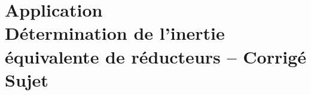 \chapter*{Application  \\ 
Détermination de l'inertie équivalente de réducteurs -- \ifprof Corrigé \else Sujet \fi}

\iflivret {} \else
\ifprof  {} \else \fi
\fi

\newcommand{\repappli}{\repRel/PSI_ExercicesCompetences/TEC/TEC-04-Meq-Jeq/}
\newcommand{\appli}{23_TrainSimple}

\renewcommand{\nomExo}{Cy_05_01_Application_00_Reducteurs}

\renewcommand{\appli}{23_TrainSimple}
\graphicspath{{\repStyle/png}{\repappli\appli/images}}


\renewcommand{\appli}{26_RoueMotrice}
\graphicspath{{\repStyle/png}{\repappli\appli/images}}


\newpage


\renewcommand{\appli}{38_Treuil}
\graphicspath{{\repStyle/png}{\repappli\appli/images}}


\renewcommand{\appli}{36_VisEcrou}
\graphicspath{{\repStyle/png}{\repappli\appli/images}}


\renewcommand{\appli}{94_Taurus}
\graphicspath{{\repStyle/png}{\repappli\appli/images}}


\newpage

\renewcommand{\appli}{33_Centrifugeuse}
\graphicspath{{\repStyle/png}{\repappli\appli/images}}


\renewcommand{\appli}{34_ControlX}
\graphicspath{{\repStyle/png}{\repappli\appli/images}}


